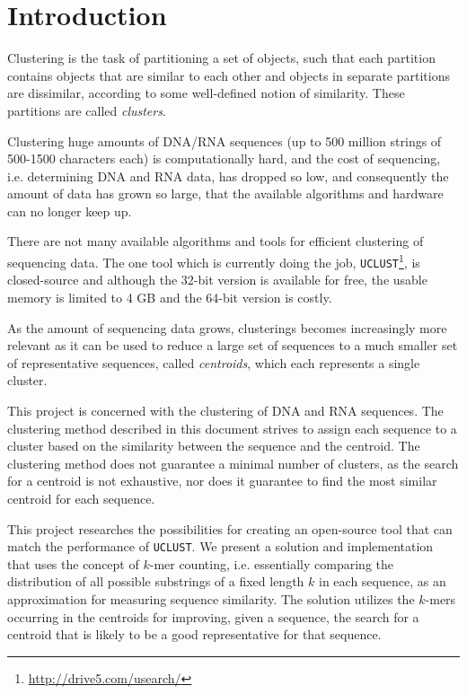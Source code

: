 \section{Introduction}

Clustering is the task of partitioning a set of objects, such that each
partition contains objects that are similar to each other and objects in
separate partitions are dissimilar, according to some well-defined notion of
similarity. These partitions are called \emph{clusters}.

Clustering huge amounts of DNA/RNA sequences (up to 500 million strings of
500-1500 characters each) is computationally hard, and the cost of sequencing,
i.e. determining DNA and RNA data, has dropped so low, and consequently the
amount of data has grown so large, that the available algorithms and hardware
can no longer keep up.~\cite{rothberg}

There are not many available algorithms and tools for efficient clustering of
sequencing data. The one tool which is currently doing the job,
\texttt{UCLUST}\footnote{\url{http://drive5.com/usearch/}}, is closed-source
and although the 32-bit version is available for free, the usable memory is
limited to 4 GB and the 64-bit version is costly.

As the amount of sequencing data grows, clusterings becomes increasingly more
relevant as it can be used to reduce a large set of sequences to a much smaller
set of representative sequences, called \emph{centroids}, which each represents
a single cluster.

This project is concerned with the clustering of DNA and RNA sequences. The
clustering method described in this document strives to assign each sequence to
a cluster based on the similarity between the sequence and the centroid. The
clustering method does not guarantee a minimal number of clusters, as the
search for a centroid is not exhaustive, nor does it guarantee to find the most
similar centroid for each sequence.

This project researches the possibilities for creating an open-source tool that
can match the performance of \texttt{UCLUST}. We present a solution and
implementation that uses the concept of $k$-mer counting, i.e. essentially
comparing the distribution of all possible substrings of a fixed length $k$ in
each sequence, as an approximation for measuring sequence similarity. The solution
utilizes the $k$-mers occurring in the centroids for improving, given a
sequence, the search for a centroid that is likely to be a good representative
for that sequence.

